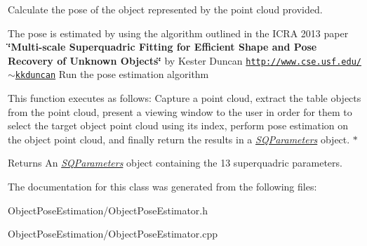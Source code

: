 Calculate the pose of the object represented by the point cloud provided. 

The pose is estimated by using the algorithm outlined in the I\-C\-R\-A 2013 paper {\bfseries \char`\"{}\-Multi-\/scale Superquadric Fitting for Efficient Shape and Pose Recovery of Unknown Objects\char`\"{}} by Kester Duncan \href{http://www.cse.usf.edu/~kkduncan}{\tt http\-://www.\-cse.\-usf.\-edu/$\sim$kkduncan} Run the pose estimation algorithm

This function executes as follows\-: Capture a point cloud, extract the table objects from the point cloud, present a viewing window to the user in order for them to select the target object point cloud using its index, perform pose estimation on the object point cloud, and finally return the results in a {\itshape \hyperlink{classope_1_1_s_q_parameters}{S\-Q\-Parameters}} object. $\ast$ \begin{DoxyReturn}{Returns}
An {\itshape \hyperlink{classope_1_1_s_q_parameters}{S\-Q\-Parameters}} object containing the 13 superquadric parameters. 
\end{DoxyReturn}


The documentation for this class was generated from the following files\-:\begin{DoxyCompactItemize}
\item 
Object\-Pose\-Estimation/Object\-Pose\-Estimator.\-h\item 
Object\-Pose\-Estimation/Object\-Pose\-Estimator.\-cpp\end{DoxyCompactItemize}
